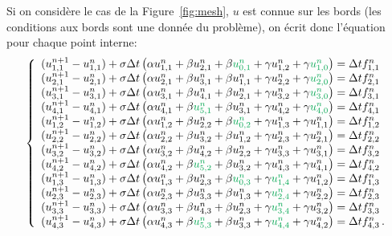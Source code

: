 \documentclass[11pt]{article}
\begin{document}
Si on considère le cas de la Figure~\ref{fig:mesh}, $u$ est connue sur les bords (les conditions aux bords sont une donnée du problème), on écrit donc l'équation pour chaque point interne:
\begin{equation}
\left\{
\begin{array}{l}
(u^{n+1}_{1,1}-u^{n}_{1,1}) + \sigma\Delta t\left(\alpha u^{n}_{1,1} + \beta u^{n}_{2,1} +  \beta {\color{Green}u^{n}_{0,1}} +  \gamma u^{n}_{1,2} +  \gamma {\color{Green}u^{n}_{1,0}}\right) = \Delta t f^{n}_{1,1} \\ 
(u^{n+1}_{2,1}-u^{n}_{2,1}) + \sigma\Delta t\left(\alpha u^{n}_{2,1} + \beta u^{n}_{3,1} +  \beta u^{n}_{1,1} +  \gamma u^{n}_{2,2} +  \gamma {\color{Green}u^{n}_{2,0}}\right) = \Delta t f^{n}_{2,1} \\ 
(u^{n+1}_{3,1}-u^{n}_{3,1}) + \sigma\Delta t\left(\alpha u^{n}_{3,1} + \beta u^{n}_{4,1} +  \beta u^{n}_{2,1} +  \gamma u^{n}_{3,2} +  \gamma {\color{Green}u^{n}_{3,0}}\right) = \Delta t f^{n}_{3,1} \\ 
(u^{n+1}_{4,1}-u^{n}_{4,1}) + \sigma\Delta t\left(\alpha u^{n}_{4,1} + \beta {\color{Green}u^{n}_{5,1}} +  \beta u^{n}_{3,1} +  \gamma u^{n}_{4,2} +  \gamma {\color{Green}u^{n}_{4,0}}\right) = \Delta t f^{n}_{4,1} \\ 
(u^{n+1}_{1,2}-u^{n}_{1,2}) + \sigma\Delta t\left(\alpha u^{n}_{1,2} + \beta u^{n}_{2,2} +  \beta {\color{Green}u^{n}_{0,2}} +  \gamma u^{n}_{1,3} +  \gamma u^{n}_{1,1}\right) = \Delta t f^{n}_{1,2} \\ 
(u^{n+1}_{2,2}-u^{n}_{2,2}) + \sigma\Delta t\left(\alpha u^{n}_{2,2} + \beta u^{n}_{3,2} +  \beta u^{n}_{1,2} +  \gamma u^{n}_{2,3} +  \gamma u^{n}_{2,1}\right) = \Delta t f^{n}_{2,2} \\ 
(u^{n+1}_{3,2}-u^{n}_{3,2}) + \sigma\Delta t\left(\alpha u^{n}_{3,2} + \beta u^{n}_{4,2} +  \beta u^{n}_{2,2} +  \gamma u^{n}_{3,3} +  \gamma u^{n}_{3,1}\right) = \Delta t f^{n}_{3,2} \\ 
(u^{n+1}_{4,2}-u^{n}_{4,2}) + \sigma\Delta t\left(\alpha u^{n}_{4,2} + \beta {\color{Green}u^{n}_{5,2}} +  \beta u^{n}_{3,2} +  \gamma u^{n}_{4,3} +  \gamma u^{n}_{4,1}\right) = \Delta t f^{n}_{4,2} \\ 
(u^{n+1}_{1,3}-u^{n}_{1,3}) + \sigma\Delta t\left(\alpha u^{n}_{1,3} + \beta u^{n}_{2,3} +  \beta {\color{Green}u^{n}_{0,3}} +  \gamma {\color{Green}u^{n}_{1,4}} +  \gamma u^{n}_{1,2}\right) = \Delta t f^{n}_{1,3} \\ 
(u^{n+1}_{2,3}-u^{n}_{2,3}) + \sigma\Delta t\left(\alpha u^{n}_{2,3} + \beta u^{n}_{3,3} +  \beta u^{n}_{1,3} +  \gamma {\color{Green}u^{n}_{2,4}} +  \gamma u^{n}_{2,2}\right) = \Delta t f^{n}_{2,3} \\ 
(u^{n+1}_{3,3}-u^{n}_{3,3}) + \sigma\Delta t\left(\alpha u^{n}_{3,3} + \beta u^{n}_{4,3} +  \beta u^{n}_{2,3} +  \gamma {\color{Green}u^{n}_{3,4}} +  \gamma u^{n}_{3,2}\right) = \Delta t f^{n}_{3,3} \\ 
(u^{n+1}_{4,3}-u^{n}_{4,3}) + \sigma\Delta t\left(\alpha u^{n}_{4,3} + \beta {\color{Green}u^{n}_{5,3}} +  \beta u^{n}_{3,3} +  \gamma {\color{Green}u^{n}_{4,4}} +  \gamma u^{n}_{4,2}\right) = \Delta t f^{n}_{4,3} \,. 
\end{array}
\right. 
\end{equation}
\end{document}
